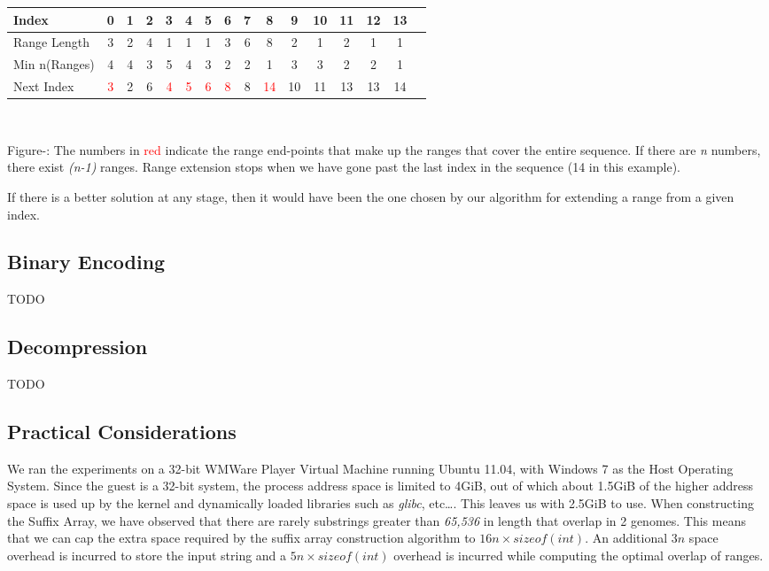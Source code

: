 \documentclass[11pt]{article}
\newcounter{fignum}
\begin{document}
\begin{center}
  \begin{tabular}{|l|c|c|c|c|c|c|c|c|c|c|c|c|c|c|c|}
    \hline
    Index         & 0 & 1 & 2 & 3 & 4 & 5 & 6 & 7 & 8 & 9 &10 &11 &12 &13\\
    \hline
    Range Length  & 3 & 2 & 4 & 1 & 1 & 1 & 3 & 6 & 8 & 2 & 1 & 2 & 1 & 1\\
    \hline
    Min n(Ranges) & 4 & 4 & 3 & 5 & 4 & 3 & 2 & 2 & 1 & 3 & 3 & 2 & 2 & 1\\
    \hline
    Next Index    & \textcolor{red}{3} & 2 & 6 & \textcolor{red}{4} & \textcolor{red}{5} & \textcolor{red}{6} & \textcolor{red}{8} & 8 & \textcolor{red}{14} &10 &11 &13 &13 &14\\
    \hline
  \end{tabular}\\
  \vspace{0.3cm}

  \footnotesize{Figure-: The numbers in
    \textcolor{red}{red} indicate the range end-points that make up
    the ranges that cover the entire sequence. If there are \textit{n}
    numbers, there exist \textit{(n-1)} ranges. Range extension stops
    when we have gone past the last index in the sequence (14 in this
    example).}

  \addtocounter{fignum}{1}
\end{center}

If there is a better solution at any stage, then it would have been
the one chosen by our algorithm for extending a range from a given
index.

\subsection{Binary Encoding}

TODO

\subsection{Decompression}

TODO

\subsection{Practical Considerations}

We ran the experiments on a 32-bit WMWare Player Virtual Machine
running Ubuntu 11.04, with Windows 7 as the Host Operating
System. Since the guest is a 32-bit system, the process address space
is limited to 4GiB, out of which about 1.5GiB of the higher address
space is used up by the kernel and dynamically loaded libraries such
as \textit{glibc}, etc\ldots{}. This leaves us with 2.5GiB to
use. When constructing the Suffix Array, we have observed that there
are rarely substrings greater than \textit{65,536} in length that
overlap in 2 genomes. This means that we can cap the extra space
required by the suffix array construction algorithm to $16n \times
sizeof(int)$. An additional $3n$ space overhead is incurred to store
the input string and a $5n \times sizeof(int)$ overhead is incurred
while computing the optimal overlap of ranges.
\end{document}
